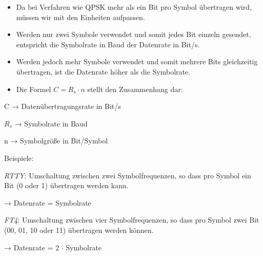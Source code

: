 \begin{frame}\begin{itemize}
  \item Da bei Verfahren wie QPSK mehr als ein Bit pro Symbol übertragen wird, müssen wir mit den Einheiten aufpassen.
  \item Werden nur zwei Symbole verwendet und somit jedes Bit einzeln gesendet, entspricht die Symbolrate in Baud der Datenrate in Bit/s.
  \item Werden jedoch mehr Symbole verwendet und somit mehrere Bits gleichzeitig übertragen, ist die Datenrate höher als die Symbolrate.
  \end{itemize}
\end{frame}

\begin{frame}\begin{itemize}
  \item Die Formel $C = R_{ s } \cdot n$ stellt den Zusammenhang dar:
  \end{itemize}
C → Datenübertragungsrate in Bit/s

$R_{ s }$ → Symbolrate in Baud

n → Symbolgröße in Bit/Symbol

\end{frame}

\begin{frame}
\end{frame}

\begin{frame}Beispiele:

\emph{RTTY}: Umschaltung zwischen zwei Symbolfrequenzen, so dass pro Symbol ein Bit (0 oder 1) übertragen werden kann.

→ Datenrate = Symbolrate

\emph{FT4}: Umschaltung zwischen vier Symbolfrequenzen, so dass pro Symbol zwei Bit (00, 01, 10 oder 11) übertragen werden können.

→ Datenrate = 2 $\cdot$ Symbolrate

\end{frame}

